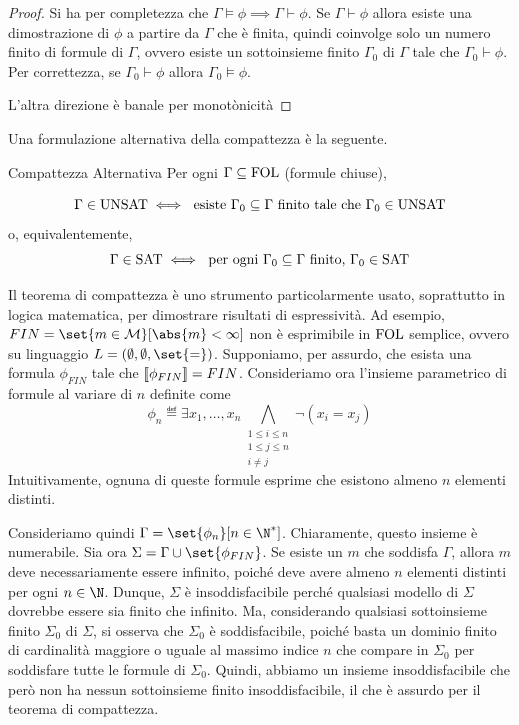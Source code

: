 \begin{proof}
  Si ha per completezza che \(\Gamma \models \phi \implies \Gamma \vdash \phi\). Se \(\Gamma \vdash \phi\) allora esiste una dimostrazione di \(\phi\) a partire da \(\Gamma\) che è finita, quindi coinvolge solo un numero finito di formule di \(\Gamma\), ovvero esiste un sottoinsieme finito \(\Gamma_0\) di \(\Gamma\) tale che \(\Gamma_0 \vdash \phi\). Per correttezza, se \(\Gamma_0 \vdash \phi\) allora \(\Gamma_0 \models \phi\).

  L'altra direzione è banale per monotònicità
\end{proof}

Una formulazione alternativa della compattezza è la seguente.
\begin{theorem}{Compattezza Alternativa}
  Per ogni \(\Gamma\subseteq\FOL\) (formule chiuse),

  \[\Gamma \in\Unsat \iff \text{ esiste } \Gamma_0 \subseteq \Gamma \text{ finito tale che } \Gamma_0 \in\Unsat\]
  o, equivalentemente, 
  \[\Gamma \in\Sat \iff \text{ per ogni } \Gamma_0 \subseteq \Gamma \text{ finito, } \Gamma_0 \in\Sat\]
\end{theorem}

Il teorema di compattezza è uno strumento particolarmente usato, soprattutto in logica matematica, per dimostrare risultati di espressività. Ad esempio, \(FIN = \set{m \in \mathcal{M}}[\abs{m} < \infty]\) non è esprimibile in \(\FOL\) semplice, ovvero su linguaggio \(L = (\emptyset, \emptyset, \set{=})\). Supponiamo, per assurdo, che esista una formula \(\phi_{FIN}\) tale che \(\den{\phi_{FIN}} = FIN\). Consideriamo ora l'insieme parametrico di formule al variare di \(n\) definite come
\[\phi_n \eqdef \exists x_1, \ldots, x_n \bigwedge_{\substack{1 \leq i \leq n \\ 1 \leq j \leq n \\ i \neq j}} \neg(x_i = x_j)\]
Intuitivamente, ognuna di queste formule esprime che esistono almeno \(n\) elementi distinti.

Consideriamo quindi \(\Gamma = \set{\phi_n}[n\in\N^*]\). Chiaramente, questo insieme è numerabile. Sia ora \(\Sigma = \Gamma \cup \set{\phi_{FIN}}\). Se esiste un \(m\) che soddisfa \(\Gamma\), allora \(m\) deve necessariamente essere infinito, poiché deve avere almeno \(n\) elementi distinti per ogni \(n\in \N\). Dunque, \(\Sigma\) è insoddisfacibile perché qualsiasi modello di \(\Sigma\) dovrebbe essere sia finito che infinito. Ma, considerando qualsiasi sottoinsieme finito \(\Sigma_0\) di \(\Sigma\), si osserva che \(\Sigma_0\) è soddisfacibile, poiché basta un dominio finito di cardinalità maggiore o uguale al massimo indice \(n\) che compare in \(\Sigma_0\) per soddisfare tutte le formule di \(\Sigma_0\). Quindi, abbiamo un insieme insoddisfacibile che però non ha nessun sottoinsieme finito insoddisfacibile, il che è assurdo per il teorema di compattezza.

